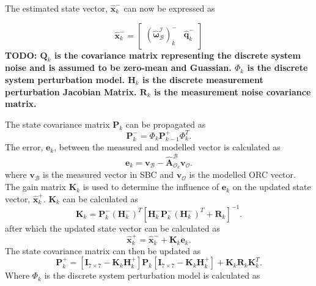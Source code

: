 The estimated state vector, $\hat{\mathbf{x}}_k^-$ can now be expressed as 

\begin{equation}
\hat{\mathbf{x}}_k^- = \begin{bmatrix} (\boldsymbol{\hat{\omega}}_{\mathcal{B}}^{\mathcal{I}})_k^- & \hat{\mathbf{q}}_k^-\end{bmatrix}
\end{equation}
\textbf{TODO: $\mathbf{Q}_k$ is the covariance matrix representing the discrete system noise and is assumed to be zero-mean and Guassian. $\Phi_k$ is the discrete system perturbation model. $\mathbf{H}_k$ is the discrete measurement perturbation Jacobian Matrix. $\mathbf{R}_k$ is the measurement noise covariance matrix.}

The state covariance matrix $\mathbf{P}_k$ can be propagated as
\begin{equation}
\mathbf{P}_k^- = \Phi_k \mathbf{P}_{k-1}^+ \Phi_k ^T.
\label{eq:P_k}
\end{equation}
The error, $\mathbf{e}_k$, between the measured and modelled vector is calculated as
\begin{equation}
\mathbf{e}_k = \mathbf{v}_\mathcal{B} - \boldsymbol{\hat{A}}^{\mathcal{B}}_{\mathcal{O}_k} \mathbf{v}_\mathcal{O}.
\label{eq:errorVector}
\end{equation}
where $\mathbf{v}_\mathcal{B}$ is the measured vector in SBC and $\mathbf{v}_\mathcal{O}$ is the modelled ORC vector. The gain matrix $\mathbf{K}_k$ is used to determine the influence of $\mathbf{e}_k$ on the updated state vector, $\hat{\mathbf{x}}_k^+$. $\mathbf{K}_k$ can be calculated as 
\begin{equation}
\mathbf{K}_k = \mathbf{P}_k^- (\mathbf{H}_k^-)^T \left[\mathbf{H}_k^- \mathbf{P}_k^- (\mathbf{H}_k^-)^T + \mathbf{R}_k \right]^{-1}.
\end{equation}
after which the updated state vector can be calculated as
\begin{equation}
\hat{\mathbf{x}}_k^+ = \hat{\mathbf{x}}_k^- + \mathbf{K}_k \mathbf{e}_k.
\label{eq:UpdatedStateVector}
\end{equation}
The state covariance matrix can then be updated as
\begin{equation}
\mathbf{P}_k^+ = \left[\mathbf{I}_{7 \times 7} - \mathbf{K}_k \mathbf{H}_k^+ \right]\mathbf{P}_k \left[\mathbf{I}_{7 \times 7} - \mathbf{K}_k \mathbf{H}_k^+ \right] + \mathbf{K}_k \mathbf{R}_k \mathbf{K}_k^T.
\label{eq:Updated_P_k}
\end{equation}
Where $\Phi_k$ is the discrete system perturbation model is calculated as
